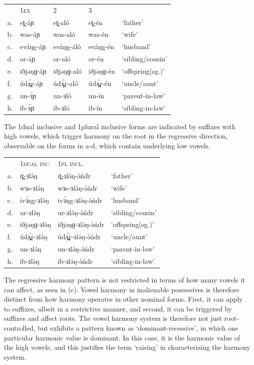 \ea
\begin{tabular}[t]{lllll}
&	1\textsc{ex}	&	2	&	3\\
a.	&	et̪-áɲ	&	et̪-aló	&	et̪-én	&	‘father’\\
b.	&	was-áɲ	&	was-aló	&	was-én	&	‘wife’\\
c.	&	eváŋg-áɲ	&	eváŋg-áló	&	eváŋg-én	&	‘husband’\\
d.	&	or-áɲ	&	or-aló	&	or-én	&	‘sibling/cousin’\\
e.	&	iðjəŋɡ-áɲ	&	iðjəŋɡ-aló	&	iðjəŋɡ-én	&	‘offspring(sg.)’\\
f.	&	údʌ̪́r-áɲ	&	údʌ̪́r-aló	&	údʌ̪́r-én	&	‘uncle/aunt’\\
g.	&	un-ɜ́ɲ	&	un-ɜló	&	un-ín	&	‘parent-in-law’\\
h.	&	ib-ɜ́ɲ	&	ib-ɜló	&	ib-ín	&	‘sibling-in-law’\\
\end{tabular}
\z

The 1dual inclusive and 1plural inclusive forms are indicated by suffixes with high vowels, which trigger harmony on the root in the regressive direction, observable on the forms in a-d, which contain underlying low vowels.

\ea
\begin{tabular}[t]{llll}
&	1\textsc{dual inc}.	&	1\textsc{pl incl}.\\
a.	&	it̪-ɜlə́ŋ	&	it̪-ɜlə́ŋ-ə́ńdr  	&	‘father’\\
b.	&	wɜs-ɜlə́ŋ	&	wɜs-ɜlə́ŋ-ə́ńdr  	&	‘wife’\\
c.	&	ivɜ́ŋg-ɜlə́ŋ	&	ivɜ́ŋg-ɜlə́ŋ-ə́ńdr  	&	‘husband’\\
d.	&	ur-ɜlə́ŋ	&	ur-ɜlə́ŋ-ə́ńdr  	&	‘sibling/cousin’\\
e.	&	iðjəŋɡ-ɜlə́ŋ	&	iðjəŋɡ-ɜlə́ŋ-ə́ńdr  	&	‘offspring(sg.)’\\
f.	&	údʌ̪́r-ɜlə́ŋ	&	údʌ̪́r-ɜlə́ŋ-ə́ńdr  	&	‘uncle/aunt’\\
g.	&	un-ɜlə́ŋ	&	un-ɜlə́ŋ-ə́ńdr  	&	‘parent-in-law’\\
h.	&	ib-ɜlə́ŋ	&	ib-ɜlə́ŋ-ə́ńdr  	&	‘sibling-in-law’\\
\end{tabular}
\z

The regressive harmony pattern is not restricted in terms of how many vowels it can affect, as seen in (c). Vowel harmony in inalienable possessives is therefore distinct from how harmony operates in other nominal forms. First, it can apply to suffixes, albeit in a restrictive manner, and second, it can be triggered by suffixes and affect roots. The vowel harmony system is therefore not just root-controlled, but exhibits a pattern known as ‘dominant-recessive’, in which one particular harmonic value is dominant. In this case, it is the harmonic value of the high vowels, and this justifies the term ‘raising’ in characterizing the harmony system. 

